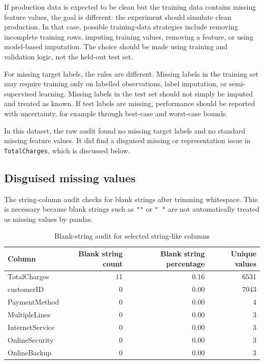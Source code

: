 If production data is expected to be clean but the training data contains missing feature values, the goal is different: the experiment should simulate clean production. In that case, possible training-data strategies include removing incomplete training rows, imputing training values, removing a feature, or using model-based imputation. The choice should be made using training and validation logic, not the held-out test set.

For missing target labels, the rules are different. Missing labels in the training set may require training only on labelled observations, label imputation, or semi-supervised learning. Missing labels in the test set should not simply be imputed and treated as known. If test labels are missing, performance should be reported with uncertainty, for example through best-case and worst-case bounds.

In this dataset, the raw audit found no missing target labels and no standard missing feature values. It did find a disguised missing or representation issue in \texttt{TotalCharges}, which is discussed below.

\subsection{Disguised missing values}

The string-column audit checks for blank strings after trimming whitespace. This is necessary because blank strings such as \texttt{""} or \texttt{" "} are not automatically treated as missing values by pandas.

\begin{table}[H]
\centering
\caption{Blank-string audit for selected string-like columns}
\label{tab:blank-string-audit}
\begin{tabular}{lrrr}
\toprule
Column & Blank string count & Blank string percentage & Unique values \\
\midrule
TotalCharges & 11 & 0.16 & 6531 \\
customerID & 0 & 0.00 & 7043 \\
PaymentMethod & 0 & 0.00 & 4 \\
MultipleLines & 0 & 0.00 & 3 \\
InternetService & 0 & 0.00 & 3 \\
OnlineSecurity & 0 & 0.00 & 3 \\
OnlineBackup & 0 & 0.00 & 3 \\
\bottomrule
\end{tabular}
\end{table}

